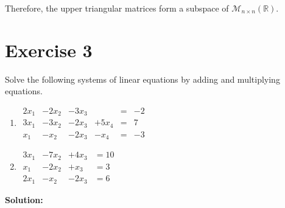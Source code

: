 \documentclass{article}
\begin{document}
Therefore, the upper triangular matrices form a subspace of $\mathcal{M}_{n\times n}(\mathbb{R})$.


\newpage

\section*{Exercise 3}
Solve the following systems of linear equations by adding and multiplying equations.
\begin{enumerate}[label=(\alph*)]
\item $\begin{aligned}
2x_1&-2x_2&-3x_3& &= &-2 \\
3x_1&-3x_2&-2x_3&+5x_4 &= &7 \\
x_1&-x_2&-2x_3&-x_4 &= &-3
\end{aligned}$

\item $\begin{aligned}
3x_1&-7x_2&+4x_3 &= 10 \\
x_1&-2x_2&+x_3 &= 3 \\
2x_1&-x_2&-2x_3 &= 6
\end{aligned}$
\end{enumerate}

\textbf{Solution:} \\
\end{document}
